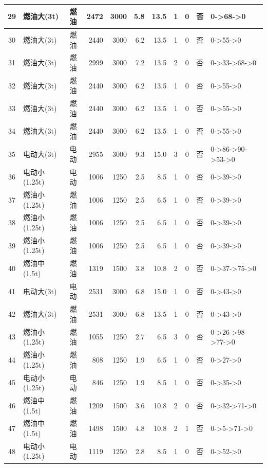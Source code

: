\begin{landscape}
\begin{longtable}{|c|l|c|r|r|r|r|c|c|c|p{2.8cm}|}
\hline
\rowcolor{gray!8}
29 & 燃油大(3t) & 燃油 & 2472 & 3000 & 5.8 & 13.5 & 1 & 0 & 否 & 0->68->0 \\
\hline
30 & 燃油大(3t) & 燃油 & 2440 & 3000 & 6.2 & 13.5 & 1 & 0 & 否 & 0->55->0 \\
\hline
\rowcolor{gray!8}
31 & 燃油大(3t) & 燃油 & 2999 & 3000 & 7.2 & 13.5 & 2 & 0 & 否 & 0->33->68->0 \\
\hline
32 & 燃油大(3t) & 燃油 & 2440 & 3000 & 6.2 & 13.5 & 1 & 0 & 否 & 0->55->0 \\
\hline
\rowcolor{gray!8}
33 & 燃油大(3t) & 燃油 & 2440 & 3000 & 6.2 & 13.5 & 1 & 0 & 否 & 0->55->0 \\
\hline
34 & 燃油大(3t) & 燃油 & 2440 & 3000 & 6.2 & 13.5 & 1 & 0 & 否 & 0->55->0 \\
\hline
\rowcolor{gray!8}
35 & 电动大(3t) & 电动 & 2955 & 3000 & 9.3 & 15.0 & 3 & 0 & 否 & 0->86->90->53->0 \\
\hline
36 & 电动小(1.25t) & 电动 & 1006 & 1250 & 2.5 & 8.5 & 1 & 0 & 否 & 0->39->0 \\
\hline
\rowcolor{gray!8}
37 & 燃油小(1.25t) & 燃油 & 1006 & 1250 & 2.5 & 6.5 & 1 & 0 & 否 & 0->39->0 \\
\hline
38 & 燃油小(1.25t) & 燃油 & 1006 & 1250 & 2.5 & 6.5 & 1 & 0 & 否 & 0->39->0 \\
\hline
\rowcolor{gray!8}
39 & 燃油小(1.25t) & 燃油 & 1006 & 1250 & 2.5 & 6.5 & 1 & 0 & 否 & 0->39->0 \\
\hline
40 & 燃油中(1.5t) & 燃油 & 1319 & 1500 & 3.8 & 10.8 & 2 & 0 & 否 & 0->37->75->0 \\
\hline
\rowcolor{gray!8}
41 & 电动大(3t) & 电动 & 2531 & 3000 & 6.8 & 15.0 & 1 & 0 & 否 & 0->43->0 \\
\hline
42 & 燃油大(3t) & 燃油 & 2531 & 3000 & 6.8 & 13.5 & 1 & 0 & 否 & 0->43->0 \\
\hline
\rowcolor{gray!8}
43 & 燃油小(1.25t) & 燃油 & 1055 & 1250 & 2.7 & 6.5 & 3 & 0 & 否 & 0->26->98->77->0 \\
\hline
44 & 燃油小(1.25t) & 燃油 & 808 & 1250 & 1.9 & 6.5 & 1 & 0 & 否 & 0->27->0 \\
\hline
\rowcolor{gray!8}
45 & 电动小(1.25t) & 电动 & 846 & 1250 & 1.9 & 8.5 & 1 & 0 & 否 & 0->35->0 \\
\hline
46 & 燃油中(1.5t) & 燃油 & 1209 & 1500 & 3.6 & 10.8 & 2 & 0 & 否 & 0->32->71->0 \\
\hline
\rowcolor{gray!8}
47 & 燃油中(1.5t) & 燃油 & 1498 & 1500 & 4.8 & 10.8 & 2 & 1 & 否 & 0->5->71->0 \\
\hline
48 & 电动小(1.25t) & 电动 & 1119 & 1250 & 2.8 & 8.5 & 1 & 0 & 否 & 0->52->0 \\

\end{longtable}
\end{landscape}
